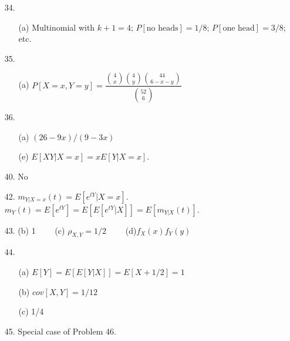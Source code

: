 \begin{enumerate}
	\item[34.] \begin{itemize}
		\item[(a)] Multinomial with $k + 1 = 4$; $P[\mbox{no heads}] = 1/8$; $P[\mbox{one head}] = 3/8$; etc.
	\end{itemize}
	
	\newpage
	\item[35.] \begin{itemize}
		\item[(a)] $P[X=x,Y=y] = \dfrac{\displaystyle {4\choose x}{4\choose y}{44\choose 6-x-y}}{\displaystyle {52\choose 6}}$
	\end{itemize}

	\item[36.] \begin{itemize}
		\item[(a)] $(26-9x)/(9-3x)$
		\item[(e)] $E[XY\vert X=x] = xE[Y\vert X=x]$.
	\end{itemize}
	
	\item[40.] No
	
	\item[42.] $m_{Y\vert X=x}(t) = E[e^{tY}\vert X=x]$. $m_Y(t) = E[e^{tY}] = E[E[e^{tY}\vert X]] =E[m_{Y\vert X}(t)]$.
	
	\item[43.] (b) 1$\qquad$ (c) $\rho_{X,Y}=1/2\qquad$ (d)$f_X(x)f_Y(y)$ 
	
	\item[44.] \begin{itemize}
		\item[(a)] $E[Y] = E[E[Y|X]] = E[X+1/2] = 1$
		\item[(b)] $cov[X,Y] = 1/12$
		\item[(c)] 1/4
	\end{itemize}

	\item[45.] Special case of Problem 46.
	

\end{enumerate}
